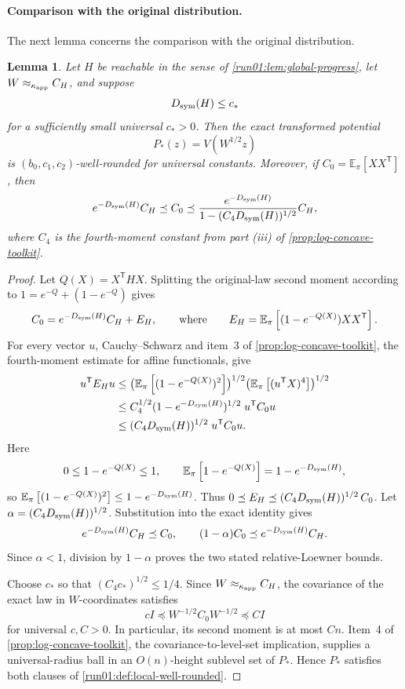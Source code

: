 \documentclass[11pt]{article}
\numberwithin{equation}{section}
\newtheorem{lemma}{Lemma}[section]
\theoremstyle{definition}
\newcommand{\E}[2]{\mathbb{E}_{#1}\left[#2\right]}
\begin{document}
\paragraph{Comparison with the original distribution.}
\space The next lemma concerns the comparison with the original distribution.

\begin{lemma}
\label{run01:lem:terminal-exact}
Let $H$ be reachable in the sense of \cref{run01:lem:global-progress}, let
$W\approx_{\kappa_{\rm app}}C_H$, and suppose
\[
 D_{\rm sym}(H)\leq c_*
\]
for a sufficiently small universal $c_*>0$.
Then the exact transformed potential
\[
 P_*(z)=V(W^{1/2}z)
\]
is $(b_0,c_1,c_2)$-well-rounded for universal constants.
Moreover, if $C_0=\E{\pi}{XX^{\mathsf T}}$, then
\[
e^{-D_{\rm sym}(H)}C_H
\preceq C_0
\preceq \frac{e^{-D_{\rm sym}(H)}} {1-(C_4D_{\rm sym}(H))^{1/2}}C_H,
\]
where $C_4$ is the fourth-moment constant from part (iii) of
\cref{prop:log-concave-toolkit}.
\end{lemma}

\begin{proof}
Let $Q(X)=X^{\mathsf T} HX$.
Splitting the original-law second moment according to $1=e^{-Q}+(1-e^{-Q})$
gives
\[
C_0=e^{-D_{\rm sym}(H)}C_H+E_H,
\qquad
\text{where}
\qquad
E_H=\E{\pi}{(1-e^{-Q(X)})XX^{\mathsf T}}.
\]
For every vector $u$, Cauchy--Schwarz and item~3 of
\cref{prop:log-concave-toolkit}, the fourth-moment estimate for affine
functionals, give
\[
 \begin{aligned}
 u^{\mathsf T} E_Hu
 &\leq
 \bigl(\E{\pi}{(1-e^{-Q(X)})^2}\bigr)^{1/2}
 \bigl(\E{\pi}{(u^{\mathsf T} X)^4}\bigr)^{1/2}\\
 &\leq
 C_4^{1/2}(1-e^{-D_{\rm sym}(H)})^{1/2}\;u^{\mathsf T} C_0u\\
 &\leq(C_4D_{\rm sym}(H))^{1/2}\;u^{\mathsf T} C_0u.
 \end{aligned}
\]
Here
\[
0
\leq1-e^{-Q(X)}
\leq1,
\qquad
\E{\pi}{1-e^{-Q(X)}}=1-e^{-D_{\rm sym}(H)},
\]
so $\E{\pi}{(1-e^{-Q(X)})^2}\leq1-e^{-D_{\rm sym}(H)}$.
Thus $0\preceq E_H\preceq(C_4D_{\rm sym}(H))^{1/2}\,C_0$.
Let $\alpha=(C_4D_{\rm sym}(H))^{1/2}$.
Substitution into the exact identity gives
\[
e^{-D_{\rm sym}(H)}C_H\preceq C_0,
\qquad
(1-\alpha)C_0\preceq e^{-D_{\rm sym}(H)}C_H.
\]
Since $\alpha<1$, division by
$1-\alpha$ proves the two stated relative-Loewner bounds.

Choose $c_*$ so that
$(C_4c_*)^{1/2}\leq1/4$.
Since $W\approx_{\kappa_{\rm app}}C_H$, the covariance of the exact law in
$W$-coordinates satisfies
\[
cI
\preceq W^{-1/2}C_0W^{-1/2}
\preceq CI
\]
for universal $c,C>0$.
In particular, its second moment is at most $Cn$.
Item~4 of \cref{prop:log-concave-toolkit}, the covariance-to-level-set
implication, supplies a universal-radius ball in an $O(n)$-height sublevel set
of
$P_*$.
Hence $P_*$ satisfies both clauses of \cref{run01:def:local-well-rounded}.
\end{proof}
\space
\end{document}
